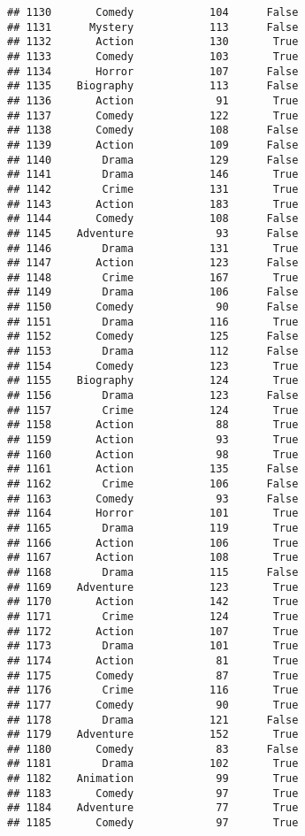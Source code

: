 \documentclass[
]{article}
\begin{document}
\begin{verbatim}
## 1130       Comedy            104      False
## 1131      Mystery            113      False
## 1132       Action            130       True
## 1133       Comedy            103       True
## 1134       Horror            107      False
## 1135    Biography            113      False
## 1136       Action             91       True
## 1137       Comedy            122       True
## 1138       Comedy            108      False
## 1139       Action            109      False
## 1140        Drama            129      False
## 1141        Drama            146       True
## 1142        Crime            131       True
## 1143       Action            183       True
## 1144       Comedy            108      False
## 1145    Adventure             93      False
## 1146        Drama            131       True
## 1147       Action            123      False
## 1148        Crime            167       True
## 1149        Drama            106      False
## 1150       Comedy             90      False
## 1151        Drama            116       True
## 1152       Comedy            125      False
## 1153        Drama            112      False
## 1154       Comedy            123       True
## 1155    Biography            124       True
## 1156        Drama            123      False
## 1157        Crime            124       True
## 1158       Action             88       True
## 1159       Action             93       True
## 1160       Action             98       True
## 1161       Action            135      False
## 1162        Crime            106      False
## 1163       Comedy             93      False
## 1164       Horror            101       True
## 1165        Drama            119       True
## 1166       Action            106       True
## 1167       Action            108       True
## 1168        Drama            115      False
## 1169    Adventure            123       True
## 1170       Action            142       True
## 1171        Crime            124       True
## 1172       Action            107       True
## 1173        Drama            101       True
## 1174       Action             81       True
## 1175       Comedy             87       True
## 1176        Crime            116       True
## 1177       Comedy             90       True
## 1178        Drama            121      False
## 1179    Adventure            152       True
## 1180       Comedy             83      False
## 1181        Drama            102       True
## 1182    Animation             99       True
## 1183       Comedy             97       True
## 1184    Adventure             77       True
## 1185       Comedy             97       True

\end{verbatim}
\end{document}
